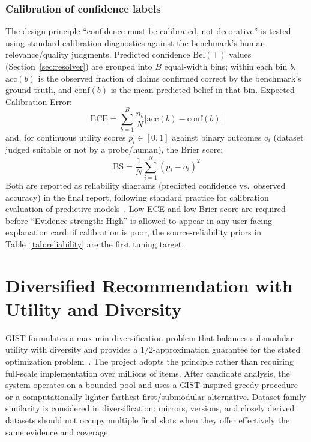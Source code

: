 \documentclass[11pt]{article}
\begin{document}
\subsubsection{Calibration of confidence labels}
\label{sec:calibration}
The design principle ``confidence must be calibrated, not decorative'' is tested using standard
calibration diagnostics against the benchmark's human relevance/quality judgments. Predicted confidence
$\mathrm{Bel}(\top)$ values (Section~\ref{sec:resolver}) are grouped into $B$ equal-width bins; within each
bin $b$, $\mathrm{acc}(b)$ is the observed fraction of claims confirmed correct by the benchmark's ground
truth, and $\mathrm{conf}(b)$ is the mean predicted belief in that bin. Expected Calibration Error:
\begin{equation}
\mathrm{ECE} = \sum_{b=1}^{B} \frac{n_b}{N} \left| \mathrm{acc}(b) - \mathrm{conf}(b) \right|
\end{equation}
and, for continuous utility scores $p_i \in [0,1]$ against binary outcomes $o_i$ (dataset judged suitable
or not by a probe/human), the Brier score:
\begin{equation}
\mathrm{BS} = \frac{1}{N}\sum_{i=1}^{N} (p_i - o_i)^2
\end{equation}
Both are reported as reliability diagrams (predicted confidence vs.\ observed accuracy) in the final
report, following standard practice for calibration evaluation of predictive models~\cite{guo-calibration}.
Low ECE and low Brier score are required before ``Evidence strength: High'' is allowed to appear in any
user-facing explanation card; if calibration is poor, the source-reliability priors in
Table~\ref{tab:reliability} are the first tuning target.

\section{Diversified Recommendation with Utility and Diversity}
GIST formulates a max-min diversification problem that balances submodular utility with diversity and
provides a $1/2$-approximation guarantee for the stated optimization problem~\cite{gist}. The project
adopts the principle rather than requiring full-scale implementation over millions of items. After
candidate analysis, the system operates on a bounded pool and uses a GIST-inspired greedy procedure or a
computationally lighter farthest-first/submodular alternative. Dataset-family similarity is considered in
diversification: mirrors, versions, and closely derived datasets should not occupy multiple final slots
when they offer effectively the same evidence and coverage.
\end{document}
